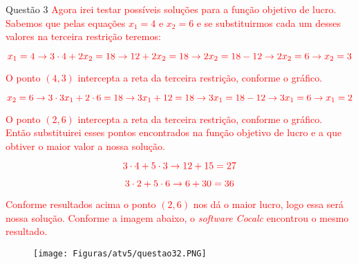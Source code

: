 \documentclass[12pt]{article}
\begin{document}
\begin{section}{Questão 3}
\noindent \textcolor{red}{Agora irei testar possíveis soluções para a função objetivo de lucro. Sabemos que pelas equações $x_1 = 4$ e $x_2 = 6$ e se substituirmos cada um desses valores na terceira restrição teremos:}

$$
\textcolor{red}{x_1 = 4 \rightarrow 3 \cdot 4 + 2x_2 = 18 \rightarrow 12 + 2x_2 = 18 \rightarrow 2x_2 = 18 -12 \rightarrow 2x_2 = 6 \rightarrow x_2 = 3}
$$

\noindent \textcolor{red}{O ponto $(4,3)$ intercepta a reta da terceira restrição, conforme o gráfico.}

$$
\textcolor{red}{x_2 = 6 \rightarrow 3 \cdot 3x_1 + 2 \cdot 6 = 18 \rightarrow 3x_1 + 12 = 18 \rightarrow 3x_1 = 18 - 12 \rightarrow 3x_1 = 6 \rightarrow x_1 = 2}
$$

\noindent \textcolor{red}{O ponto $(2,6)$ intercepta a reta da terceira restrição, conforme o gráfico.}\\

\noindent \textcolor{red}{Então substituirei esses pontos encontrados na função objetivo de lucro e a que obtiver o maior valor a nossa solução.}

$$
\textcolor{red}{3 \cdot 4 + 5 \cdot 3 \rightarrow 12 + 15 = 27}
$$

$$
\textcolor{red}{3 \cdot 2 + 5 \cdot 6 \rightarrow 6 + 30 = 36}
$$

\noindent \textcolor{red}{Conforme resultados acima o ponto $(2,6)$ nos dá o maior lucro, logo essa será nossa solução. Conforme a imagem abaixo, o \textit{software Cocalc} encontrou o mesmo resultado.}

\begin{figure}[H]
    \centering
    \texttt{[image: Figuras/atv5/questao32.PNG]}
\end{figure}

\end{section}
\end{document}
